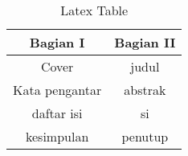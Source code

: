 \begin{table}[h]
\caption{Latex Table}
\centering
\begin{tabular}{c|c}
\hline
\textbf{Bagian I}&\textbf{Bagian II}\\
\hline
Cover&judul\\
\hline
Kata pengantar&abstrak\\
\hline
daftar isi&si\\
\hline
kesimpulan&penutup\\
\hline
\end{tabular}
\label{table:permisalan}
\end{table}